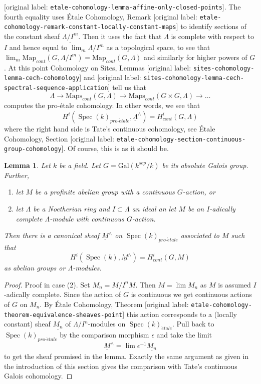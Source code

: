 \documentclass[10pt,a4paper]{article}
\theoremstyle{plain}
\newtheorem{lemma}[subsection]{Lemma}
\theoremstyle{definition}
\theoremstyle{remark}
\numberwithin{equation}{subsection}
\def\lim{\mathop{\mathrm{lim}}\nolimits}
\def\Spec{\mathop{\mathrm{Spec}}}
\def\proetale{{pro\text{-}\acute{e}tale}}
\def\etale{{\acute{e}tale}}
\begin{document}
\textnormal{[original label: \nolinkurl{etale-cohomology-lemma-affine-only-closed-points}]}.
The fourth equality uses
\'Etale Cohomology, Remark
\textnormal{[original label: \nolinkurl{etale-cohomology-remark-constant-locally-constant-maps}]}
to identify sections of the constant sheaf $\underline{\Lambda/I^m}$.
Then it uses the fact that $\Lambda$ is complete with respect to $I$
and hence equal to $\lim_m \Lambda/I^m$ as a topological space, to see that
$\lim_m \text{Map}_{cont}(G, \Lambda/I^m) = \text{Map}_{cont}(G, \Lambda)$
and similarly for higher powers of $G$.
At this point Cohomology on Sites, Lemmas
\textnormal{[original label: \nolinkurl{sites-cohomology-lemma-cech-cohomology}]}  and
\textnormal{[original label: \nolinkurl{sites-cohomology-lemma-cech-spectral-sequence-application}]}
tell us that
$$
\Lambda \to \text{Maps}_{cont}(G, \Lambda) \to
\text{Maps}_{cont}(G \times G, \Lambda) \to \ldots
$$
computes the pro-\'etale cohomology. In other words, we see that
$$
H^i(\Spec(k)_\proetale, \underline{\Lambda}^\wedge)
=
H^i_{cont}(G, \Lambda)
$$
where the right hand side is Tate's continuous cohomology, see
\'Etale Cohomology, Section
\textnormal{[original label: \nolinkurl{etale-cohomology-section-continuous-group-cohomology}]}.
Of course, this is as it should be.

\begin{lemma}
\label{lemma-more-general-point}
Let $k$ be a field. Let $G = \text{Gal}(k^{sep}/k)$ be its absolute
Galois group. Further, 
\begin{enumerate}
\item let $M$ be a profinite abelian group with a continuous
$G$-action, or
\item let $\Lambda$ be a Noetherian ring and $I \subset \Lambda$ an ideal
an let $M$ be an $I$-adically complete $\Lambda$-module with continuous
$G$-action.
\end{enumerate}
Then there is a canonical sheaf $\underline{M}^\wedge$ on
$\Spec(k)_\proetale$ associated to $M$ such that
$$
H^i(\Spec(k), \underline{M}^\wedge) = H^i_{cont}(G, M)
$$
as abelian groups or $\Lambda$-modules.
\end{lemma}

\begin{proof}
Proof in case (2). Set $M_n = M/I^nM$. Then $M = \lim M_n$ as $M$ is
assumed $I$-adically complete. Since the action of $G$ is continuous
we get continuous actions of $G$ on $M_n$. By \'Etale Cohomology, Theorem
\textnormal{[original label: \nolinkurl{etale-cohomology-theorem-equivalence-sheaves-point}]}
this action corresponds to a (locally constant) sheaf
$\underline{M_n}$ of $\Lambda/I^n$-modules on $\Spec(k)_\etale$.
Pull back to $\Spec(k)_\proetale$ by the comparison morphism
$\epsilon$ and take the limit
$$
\underline{M}^\wedge = \lim \epsilon^{-1}\underline{M_n}
$$
to get the sheaf promised in the lemma. Exactly the same argument as
given in the introduction of this section gives the comparison
with Tate's continuous Galois cohomology.
\end{proof}
\end{document}
